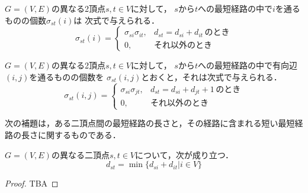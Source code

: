 \begin{lemma}
  $G=(V,E)$の異なる2頂点$s,t \in V$に対して，
  $s$から$t$への最短経路の中で$i$を通るものの個数$\sigma_{st}(i)$は
  次式で与えられる．
  \begin{equation}
    \sigma_{st}(i)=
    \left\{
    \begin{array}{ll}
      \sigma_{si} \sigma_{it}, & d_{st}=d_{si}+d_{it}\,\mbox{のとき} \\
      0, & \mbox{それ以外のとき}
    \end{array}
    \right.
    \label{eqn:sigma_sti}
  \end{equation}
  \label{lemma:3}
\end{lemma}

\begin{lemma}
  $G=(V,E)$の異なる2頂点$s,t \in V$に対して，
  $s$から$t$への最短経路の中で有向辺$(i,j)$を通るものの個数を
  $\sigma_{st}(i,j)$とおくと，それは次式で与えられる．
  \begin{equation*}
    \sigma_{st}(i,j)=
    \left\{
    \begin{array}{ll}
      \sigma_{si} \sigma_{jt}, & d_{st}=d_{si}+d_{jt}+1\,\mbox{のとき} \\
      0, & \mbox{それ以外のとき}
    \end{array}
    \right.
  \end{equation*}
  \label{lemma:4}
\end{lemma}

次の補題は，ある二頂点間の最短経路の長さと，その経路に含まれる短い最短経路の長さに関するものである．
\begin{lemma}
  \label{lemma:distance-of-path}
  $G=(V,E)$の異なる二頂点$s,t\in V$について，次が成り立つ．
  \begin{equation*}
    d_{st}=\min\{d_{si}+d_{it}|i\in V\}
  \end{equation*}
\end{lemma}
\begin{proof}
  TBA
\end{proof}

